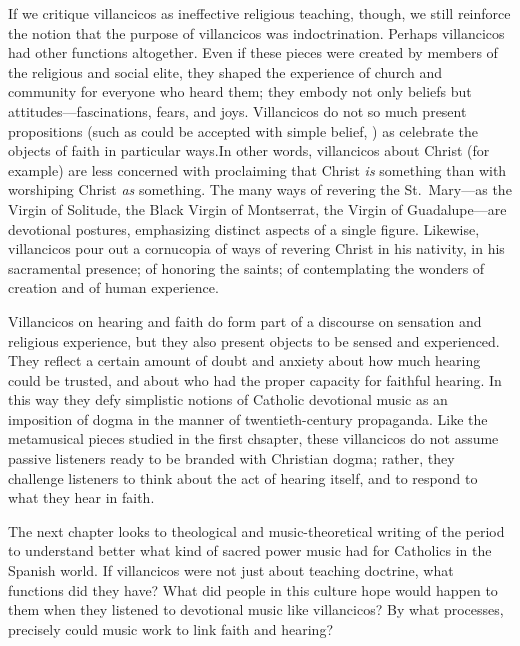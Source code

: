 If we critique villancicos as ineffective religious teaching, though, we still reinforce the notion that the purpose of villancicos was indoctrination.
Perhaps villancicos had other functions altogether.
Even if these pieces were created by members of the religious and social elite, they shaped the experience of church and community for everyone who heard them; they embody not only beliefs but attitudes---fascinations, fears, and joys.
Villancicos do not so much present propositions (such as could be accepted with simple belief, ) as celebrate the objects of faith in particular ways.
In other words, villancicos about Christ (for example) are less concerned with proclaiming that Christ \emph{is} something than with worshiping Christ \emph{as} something. 
The many ways of revering the St.\ Mary---as the Virgin of Solitude, the Black Virgin of Montserrat, the Virgin of Guadalupe---are devotional postures, emphasizing distinct aspects of a single figure.\citXXX{}
Likewise, villancicos pour out a cornucopia of ways of revering Christ in his nativity, in his sacramental presence; of honoring the saints; of contemplating the wonders of creation and of human experience.

Villancicos on hearing and faith do form part of a discourse on sensation and religious experience, but they also present objects to be sensed and experienced.
They reflect a certain amount of doubt and anxiety about how much hearing could be trusted, and about who had the proper capacity for faithful hearing.
In this way they defy simplistic notions of Catholic devotional music as an imposition of dogma in the manner of twentieth-century propaganda.
Like the metamusical pieces studied in the first chsapter, these villancicos do not assume passive listeners ready to be branded with Christian dogma; rather, they challenge listeners to think about the act of hearing itself, and to respond to what they hear in faith. 

The next chapter looks to theological and music-theoretical writing of the period to understand better what kind of sacred power music had for Catholics in the Spanish world.
If villancicos were not just about teaching doctrine, what functions did they have?
What did people in this culture hope would happen to them when they listened to devotional music like villancicos?
By what processes, precisely could music work to link faith and hearing?


